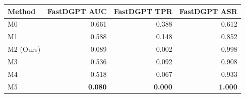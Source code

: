 \begin{tabular}{lrrr}
\toprule
Method & FastDGPT AUC & FastDGPT TPR & FastDGPT ASR \\
\midrule
M0 & 0.661 & 0.388 & 0.612 \\
M1 & 0.588 & 0.148 & 0.852 \\
M2 (Ours) & 0.089 & 0.002 & 0.998 \\
M3 & 0.536 & 0.092 & 0.908 \\
M4 & 0.518 & 0.067 & 0.933 \\
M5 & \textbf{0.080} & \textbf{0.000} & \textbf{1.000} \\
\bottomrule
\end{tabular}
